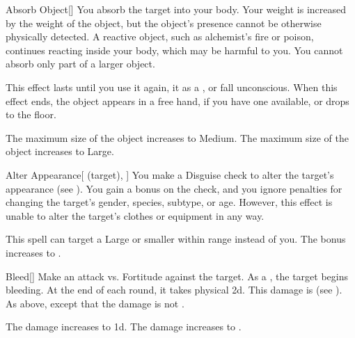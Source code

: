 \lowercase{\hypertarget{spell:Absorb Object}{}}\label{spell:Absorb Object}
\begin{freeability}[Rank 3]{\hypertarget{spell:Absorb Object}{Absorb Object}}[]
You absorb the target into your body.
Your weight is increased by the weight of the object, but the object's presence cannot be otherwise physically detected.
A reactive object, such as alchemist's fire or poison, continues reacting inside your body, which may be harmful to you.
You cannot absorb only part of a larger object.

This effect lasts until you use it again,  it as a , or fall unconscious.
When this effect ends, the object appears in a free hand, if you have one available, or drops to the floor.

\rankline
{} The maximum size of the object increases to Medium.
 The maximum size of the object increases to Large.

\end{freeability}
\vspace{0.25em}



\lowercase{\hypertarget{spell:Alter Appearance}{}}\label{spell:Alter Appearance}
\begin{attuneability}[Rank 3]{\hypertarget{spell:Alter Appearance}{Alter Appearance}}[ (target), ]
You make a Disguise check to alter the target's appearance (see ).
You gain a  bonus on the check, and you ignore penalties for changing the target's gender, species, subtype, or age.
However, this effect is unable to alter the target's clothes or equipment in any way.

\rankline
{} This spell can target a Large or smaller  within \rngmed range instead of you.
 The bonus increases to .

\end{attuneability}
\vspace{0.25em}



\lowercase{\hypertarget{spell:Bleed}{}}\label{spell:Bleed}
\begin{freeability}[Rank 4]{\hypertarget{spell:Bleed}{Bleed}}[]
Make an attack vs. Fortitude against the target.
\hit As a , the target begins bleeding.
At the end of each round, it takes physical  \minus2d.
This damage is  (see ).
\crit As above, except that the damage is not .

\rankline
{} The damage increases to  \minus1d.
 The damage increases to .

\end{freeability}
\vspace{0.25em}



